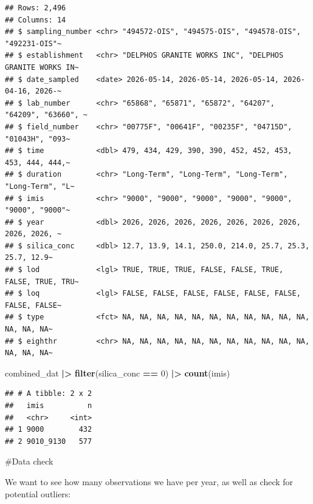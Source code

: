 \documentclass[
]{article}
\newenvironment{Shaded}{\begin{snugshade}}{\end{snugshade}}
\newcommand{\DecValTok}[1]{\textcolor[rgb]{0.00,0.00,0.81}{#1}}
\newcommand{\FunctionTok}[1]{\textcolor[rgb]{0.13,0.29,0.53}{\textbf{#1}}}
\newcommand{\NormalTok}[1]{#1}
\newcommand{\SpecialCharTok}[1]{\textcolor[rgb]{0.81,0.36,0.00}{\textbf{#1}}}
\begin{document}
\begin{verbatim}
## Rows: 2,496
## Columns: 14
## $ sampling_number <chr> "494572-OIS", "494575-OIS", "494578-OIS", "492231-OIS"~
## $ establishment   <chr> "DELPHOS GRANITE WORKS INC", "DELPHOS GRANITE WORKS IN~
## $ date_sampled    <date> 2026-05-14, 2026-05-14, 2026-05-14, 2026-04-16, 2026-~
## $ lab_number      <chr> "65868", "65871", "65872", "64207", "64209", "63660", ~
## $ field_number    <chr> "00775F", "00641F", "00235F", "04715D", "01043H", "093~
## $ time            <dbl> 479, 434, 429, 390, 390, 452, 452, 453, 453, 444, 444,~
## $ duration        <chr> "Long-Term", "Long-Term", "Long-Term", "Long-Term", "L~
## $ imis            <chr> "9000", "9000", "9000", "9000", "9000", "9000", "9000"~
## $ year            <dbl> 2026, 2026, 2026, 2026, 2026, 2026, 2026, 2026, 2026, ~
## $ silica_conc     <dbl> 12.7, 13.9, 14.1, 250.0, 214.0, 25.7, 25.3, 25.7, 12.9~
## $ lod             <lgl> TRUE, TRUE, TRUE, FALSE, FALSE, TRUE, FALSE, TRUE, TRU~
## $ loq             <lgl> FALSE, FALSE, FALSE, FALSE, FALSE, FALSE, FALSE, FALSE~
## $ type            <fct> NA, NA, NA, NA, NA, NA, NA, NA, NA, NA, NA, NA, NA, NA~
## $ eighthr         <chr> NA, NA, NA, NA, NA, NA, NA, NA, NA, NA, NA, NA, NA, NA~
\end{verbatim}

\begin{Shaded}
\begin{Highlighting}[]
\NormalTok{combined\_dat }\SpecialCharTok{|\textgreater{}} 
  \FunctionTok{filter}\NormalTok{(silica\_conc }\SpecialCharTok{==} \DecValTok{0}\NormalTok{) }\SpecialCharTok{|\textgreater{}} 
  \FunctionTok{count}\NormalTok{(imis)}
\end{Highlighting}
\end{Shaded}

\begin{verbatim}
## # A tibble: 2 x 2
##   imis          n
##   <chr>     <int>
## 1 9000        432
## 2 9010_9130   577
\end{verbatim}

\#Data check

We want to see how many observations we have per year, as well as check
for potential outliers:

\begin{Shaded}
\end{Shaded}
\end{document}
